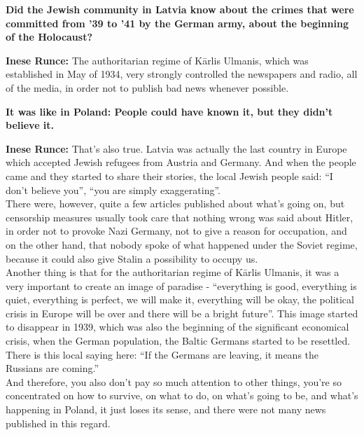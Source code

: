 \textbf{Did the Jewish community in Latvia know about the crimes that were committed from '39 to '41 by the German army, about the beginning of the Holocaust?}

\textbf{Inese Runce:} The authoritarian regime of Kārlis Ulmanis, which was established in May of 1934, very strongly controlled the newspapers and radio, all of the media, in order not to publish bad news whenever possible.

\textbf{It was like in Poland: People could have known it, but they didn’t believe it.}

\textbf{Inese Runce:} That’s also true. Latvia was actually the last country in Europe which accepted Jewish refugees from Austria and Germany. And when the people came and they started to share their stories, the local Jewish people said: ``I don’t believe you'', ``you are simply exaggerating''.\\
There were, however, quite a few articles published about what’s going on, but censorship measures usually took care that nothing wrong was said about Hitler, in order not to provoke Nazi Germany, not to give a reason for occupation, and on the other hand, that nobody spoke of what happened under the Soviet regime, because it could also give Stalin a possibility to occupy us.\\
Another thing is that for the authoritarian regime of Kārlis Ulmanis, it was a very important to create an image of paradise - ``everything is good, everything is quiet, everything is perfect, we will make it, everything will be okay, the political crisis in Europe will be over and there will be a bright future''. This image started to disappear in 1939, which was also the beginning of the significant economical crisis, when the German population, the Baltic Germans started to be resettled. There is this local saying here: ``If the Germans are leaving, it means the Russians are coming.''\\
And therefore, you also don't pay so much attention to other things, you're so concentrated on how to survive, on what to do, on what's going to be, and what's happening in Poland, it just loses its sense, and there were not many news published in this regard.
